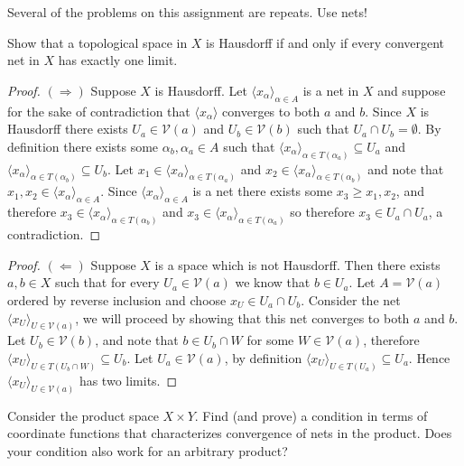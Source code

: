 \documentclass[minion]{homework651}
\begin{document}
Several of the problems on this assignment are repeats.  Use nets!
\begin{problems}

\problem Show that a topological space in $X$ is Hausdorff if and only if every 
convergent net in $X$ has exactly one limit.
\begin{proof}$(\Rightarrow)$ Suppose $X$ is Hausdorff. Let $\langle x_\alpha\rangle_{\alpha \in A}$ is a net in $X$
    and suppose for the sake of contradiction that $\langle x_\alpha \rangle$ converges to both $a$ and $b$.
    Since $X$ is Hausdorff there exists $U_a \in \mathcal{V}(a)$ and $U_b \in \mathcal{V}(b)$ such that $U_a \cap U_b = \emptyset$.
    By definition there exists some $\alpha_b, \alpha_a \in A$ such that $\langle x_\alpha\rangle_{\alpha \in {T(\alpha_a)}} \subseteq U_a$
    and $\langle x_\alpha\rangle_{\alpha \in {T(\alpha_b)}} \subseteq U_b$. Let $x_1 \in \langle x_\alpha\rangle_{\alpha \in {T(\alpha_a)}}$
    and $x_2 \in \langle x_\alpha\rangle_{\alpha \in {T(\alpha_b)}}$ and note that $x_1, x_2 \in \langle x_\alpha\rangle_{\alpha \in A}$. Since
    $\langle x_\alpha\rangle_{\alpha \in A}$ is a net there exists some $x_3 \geq x_1, x_2$, and therefore $x_3 \in \langle x_\alpha\rangle_{\alpha \in {T(\alpha_b)}}$
    and $x_3 \in \langle x_\alpha\rangle_{\alpha \in {T(\alpha_a)}}$ so therefore $x_3 \in U_a \cap U_a$, a contradiction. 
\end{proof}

\begin{proof}$(\Leftarrow)$ Suppose $X$ is a space which is not Hausdorff. Then there exists $a, b \in X$ such that 
    for every $U_a \in \mathcal{V}(a)$ we know that $b \in U_a$. Let $A =\mathcal{V}(a)$ ordered by reverse inclusion and choose 
    $x_U \in U_a \cap U_b$. Consider the net $\langle x_U \rangle_{U \in \mathcal{V}(a)}$, we will proceed by showing that this net 
    converges to both $a$ and $b$. Let $U_b \in \mathcal{V}(b)$, and note that $b \in U_b \cap W$ for some $W \in \mathcal{V}(a)$, therefore 
    $\langle x_U \rangle_{U \in T(U_b \cap W)} \subseteq U_b$. Let $U_a \in \mathcal{V}(a)$, by definition $\langle x_U \rangle_{U \in T(U_a)} \subseteq U_a$.
    Hence $\langle x_U \rangle_{U \in \mathcal{V}(a)}$ has two limits. 
\end{proof}

\problem Consider the product space $X\times Y$.  Find (and prove) a condition
in terms of coordinate functions that characterizes convergence of nets in the product.
Does your condition also work for an arbitrary product?\\


\end{problems}
\end{document}
